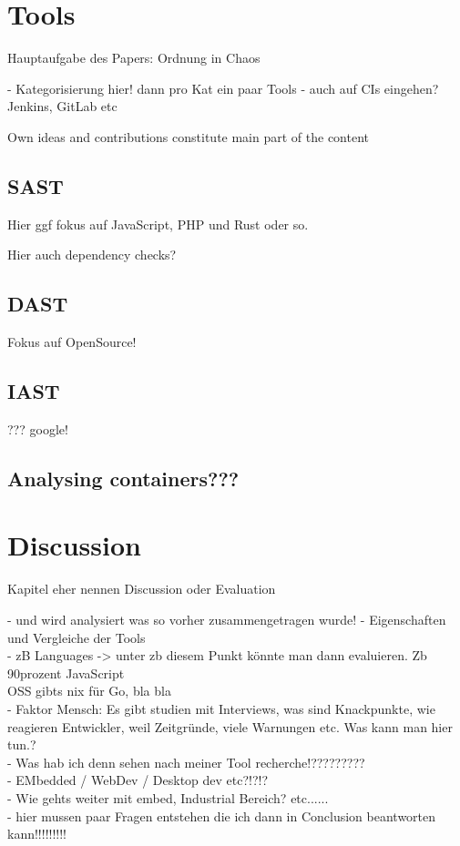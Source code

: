 \documentclass[conference]{IEEEtran}
\begin{document}
\newpage

\section{Tools}
Hauptaufgabe des Papers: Ordnung in Chaos

- Kategorisierung hier! dann pro Kat ein paar Tools
- auch auf CIs eingehen? Jenkins, GitLab etc

Own ideas and contributions constitute main part of the content


\subsection{SAST}
Hier ggf fokus auf JavaScript, PHP und Rust oder so.

Hier auch dependency checks?

\subsection{DAST}
Fokus auf OpenSource!

\subsection{IAST}
??? google!

\subsection{Analysing containers???}


\section{Discussion}


Kapitel eher nennen Discussion oder Evaluation

- und wird analysiert was so vorher zusammengetragen wurde!
- Eigenschaften und Vergleiche der Tools\\
- zB Languages -> unter zb diesem Punkt könnte man dann evaluieren. Zb 90prozent JavaScript\\
OSS gibts nix für Go, bla bla\\
- Faktor Mensch: Es gibt studien mit Interviews, was sind Knackpunkte, wie reagieren Entwickler, weil Zeitgründe, viele Warnungen etc. Was kann man hier tun.?\\
- Was hab ich denn sehen nach meiner Tool recherche!?????????\\
- EMbedded / WebDev / Desktop dev etc?!?!?\\
- Wie gehts weiter mit embed, Industrial Bereich? etc......\\
- hier mussen paar Fragen entstehen die ich dann in Conclusion beantworten kann!!!!!!!!!\\
\end{document}
